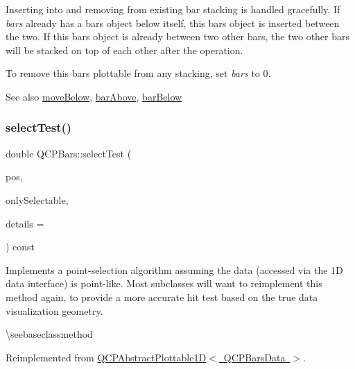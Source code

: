 Inserting into and removing from existing bar stacking is handled gracefully. If {\itshape bars} already has a bars object below itself, this bars object is inserted between the two. If this bars object is already between two other bars, the two other bars will be stacked on top of each other after the operation.

To remove this bars plottable from any stacking, set {\itshape bars} to 0.

\begin{DoxySeeAlso}{See also}
\mbox{\hyperlink{class_q_c_p_bars_a69fc371346980f19177c3d1ecdad78ee}{move\+Below}}, \mbox{\hyperlink{class_q_c_p_bars_ab97f2acd9f6cb40d2cc3c33d278f0e78}{bar\+Above}}, \mbox{\hyperlink{class_q_c_p_bars_a1b58664864b141f45e02044a855b3213}{bar\+Below}} 
\end{DoxySeeAlso}
\mbox{\label{class_q_c_p_bars_a121f899c27af3186fe93dcd0eb98f49b}} 
\subsubsection{\texorpdfstring{selectTest()}{selectTest()}}
{\footnotesize\ttfamily double Q\+C\+P\+Bars\+::select\+Test (\begin{DoxyParamCaption}\item[{const Q\+PointF \&}]{pos,  }\item[{bool}]{only\+Selectable,  }\item[{Q\+Variant $\ast$}]{details = {} }\end{DoxyParamCaption}) const\hspace{0.3cm}{\ttfamily [virtual]}}

Implements a point-\/selection algorithm assuming the data (accessed via the 1D data interface) is point-\/like. Most subclasses will want to reimplement this method again, to provide a more accurate hit test based on the true data visualization geometry.

\textbackslash{}seebaseclassmethod 

Reimplemented from \mbox{\hyperlink{class_q_c_p_abstract_plottable1_d_a4611b43bcb6441b2154eb4f4e0a33db2}{Q\+C\+P\+Abstract\+Plottable1\+D$<$ Q\+C\+P\+Bars\+Data $>$}}.

\mbox{\label{class_q_c_p_bars_ab03bb6125c3e983b89d694f75ce6b3d5}} 

